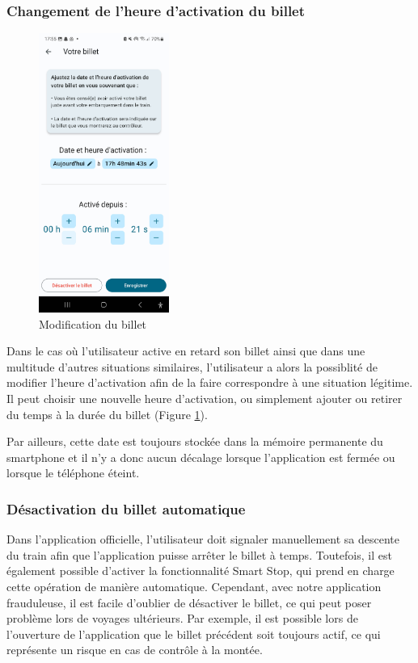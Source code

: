 \documentclass[a4paper]{article}
\begin{document}
\clearpage

\subsubsection{Changement de l'heure d'activation du billet}

\begin{figure}
  \begin{center}
    \includegraphics[width=0.38\textwidth]{illustrations/images/mode_dieu/votre_billet/votre_billet.jpg}
  \end{center}
  \caption{\centering Modification du billet}
  \label{fig:votre_billet}
\end{figure}

Dans le cas où l'utilisateur active en retard son billet ainsi que dans une multitude d'autres situations similaires,
l'utilisateur a alors la possiblité de modifier l'heure d'activation afin de la faire correspondre à une situation légitime.
Il peut choisir une nouvelle heure d'activation, ou simplement ajouter ou retirer du temps à la durée
du billet (Figure \ref{fig:votre_billet}).

Par ailleurs, cette date est toujours stockée dans la mémoire permanente du smartphone
et il n'y a donc aucun décalage lorsque l'application est fermée ou lorsque le téléphone éteint.
\subsubsection{Désactivation du billet automatique} \label{sssec:desactivation_billet_auto}
Dans l'application officielle, l'utilisateur doit signaler manuellement sa descente du
train afin que l'application puisse arrêter le billet à temps. Toutefois, il est
également possible d'activer la fonctionnalité \og Smart Stop\fg, qui prend en charge cette
opération de manière automatique. Cependant, avec notre application frauduleuse,
il est facile d'oublier de désactiver le billet, ce qui peut poser problème lors
de voyages ultérieurs.  Par exemple, il est possible lors de l'ouverture de
l'application que le billet précédent soit
toujours actif, ce qui représente un risque en cas de contrôle à la montée.
\end{document}

